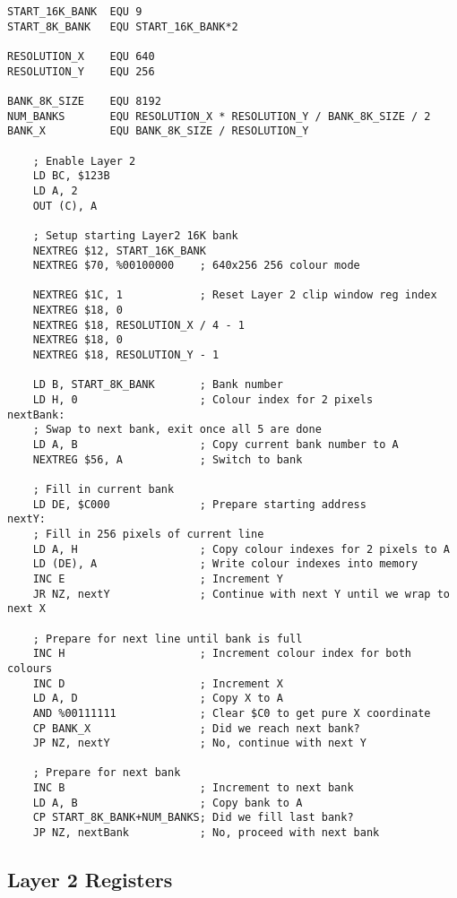 \begin{lstlisting}
START_16K_BANK  EQU 9
START_8K_BANK   EQU START_16K_BANK*2

RESOLUTION_X    EQU 640
RESOLUTION_Y    EQU 256

BANK_8K_SIZE    EQU 8192
NUM_BANKS       EQU RESOLUTION_X * RESOLUTION_Y / BANK_8K_SIZE / 2
BANK_X          EQU BANK_8K_SIZE / RESOLUTION_Y

    ; Enable Layer 2
    LD BC, $123B
    LD A, 2
    OUT (C), A

    ; Setup starting Layer2 16K bank
    NEXTREG $12, START_16K_BANK
    NEXTREG $70, %00100000    ; 640x256 256 colour mode

    NEXTREG $1C, 1            ; Reset Layer 2 clip window reg index
    NEXTREG $18, 0
    NEXTREG $18, RESOLUTION_X / 4 - 1
    NEXTREG $18, 0
    NEXTREG $18, RESOLUTION_Y - 1

    LD B, START_8K_BANK       ; Bank number
    LD H, 0                   ; Colour index for 2 pixels
nextBank:
    ; Swap to next bank, exit once all 5 are done
    LD A, B                   ; Copy current bank number to A
    NEXTREG $56, A            ; Switch to bank

    ; Fill in current bank
    LD DE, $C000              ; Prepare starting address
nextY:
    ; Fill in 256 pixels of current line
    LD A, H                   ; Copy colour indexes for 2 pixels to A
    LD (DE), A                ; Write colour indexes into memory
    INC E                     ; Increment Y
    JR NZ, nextY              ; Continue with next Y until we wrap to next X

    ; Prepare for next line until bank is full
    INC H                     ; Increment colour index for both colours
    INC D                     ; Increment X
    LD A, D                   ; Copy X to A
    AND %00111111             ; Clear $C0 to get pure X coordinate
    CP BANK_X                 ; Did we reach next bank?
    JP NZ, nextY              ; No, continue with next Y

    ; Prepare for next bank
    INC B                     ; Increment to next bank
    LD A, B                   ; Copy bank to A
    CP START_8K_BANK+NUM_BANKS; Did we fill last bank?
    JP NZ, nextBank           ; No, proceed with next bank
\end{lstlisting}


\subsection{Layer 2 Registers}
\label{zx_next_layer2_registers}

